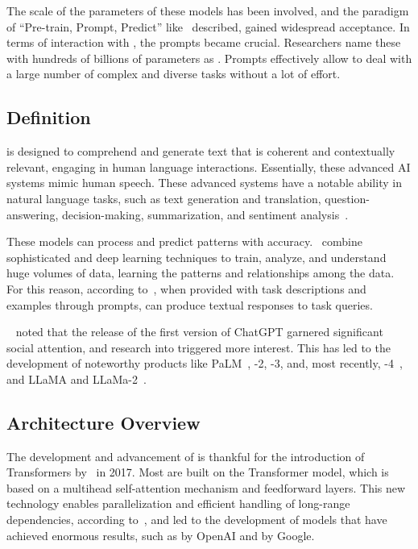 The scale of the parameters of these models has been involved, and the paradigm of ``Pre-train, Prompt, Predict'' like~\citet{liu_prompting_nodate} described, gained widespread acceptance. In terms of interaction with {\lm}, the prompts became crucial. Researchers name these {\plm} with hundreds of billions of parameters as {\llm}. Prompts effectively allow {\llm} to deal with a large number of complex and diverse tasks without a lot of effort.


\subsection{Definition}

{\llm} is designed to comprehend and generate text that is coherent and contextually relevant, engaging in human language interactions. Essentially, these advanced AI systems mimic human speech. These advanced {\ai} systems  have a notable ability in natural language tasks, such as text generation and translation, question-answering, decision-making, summarization, and sentiment analysis~\cite{zhao_survey_2023}.

These models can process and predict patterns with accuracy.~\citet{hadi_LLM_2023} combine sophisticated {\slm} and deep learning techniques to train, analyze, and understand huge volumes of data, learning the patterns and relationships among the data. For this reason, according to~\citet{naveed_comprehensive_2023}, when provided with task descriptions and examples through prompts, {\llm} can produce textual responses to task queries. 

~\citet{liu_prompting_nodate} noted that the release of the first version of ChatGPT garnered significant social attention, and research into {\llm} triggered more interest. This has led to the development of noteworthy products like PaLM~\cite{anil_palm_2023}, {\gpt}-2, {\gpt}-3, and, most recently, {\gpt}-4~\cite{openai_gpt-4_2023}, and LLaMA and LLaMa-2~\cite{touvron_llama_2023}.


\subsection{Architecture Overview}

The development and advancement of {\llm} is thankful for the introduction of Transformers by~\citet{vaswani_attention_2023} in 2017. Most {\llm} are built on the Transformer model, which is based on a multihead self-attention mechanism and feedforward layers. This new technology enables parallelization and efficient handling of long-range dependencies, according to~\citet{hadi_LLM_2023}, and led to the development of models that have achieved enormous results, such as {\gpt} by OpenAI and {\bert} by Google. 


